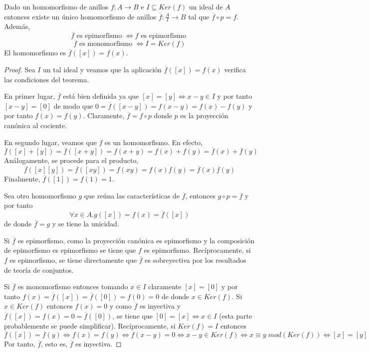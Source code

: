 \begin{proposition}
	Dado un homomorfismo de anillos $f:A \to B$ e $I \subseteq Ker(f)$ un ideal de $A$ entonces existe un único homomorfismo de anillos $\overline{f}:\frac{A}{I} \to B$ tal que $\overline{f} \circ p = f$. Además, $$\overline{f} \text{ es epimorfismo } \iff f \text{ es epimorfismo }$$ $$\overline{f} \text{ es monomorfismo } \iff I = Ker(f)$$ El homomorfismo es $\overline{f}([x]) = f(x)$. 
	
\end{proposition}
\begin{proof}
	Sea $I$ un tal ideal y veamos que la aplicación $\overline{f}([x]) = f(x)$ verifica las condiciones del teorema. 
	
	En primer lugar, $\overline{f}$ está bien definida ya que $[x] = [y] \iff x-y \in I$ y por tanto $[x-y] = [0]$ de modo que $0 = \overline{f}([x-y]) = f(x-y) = f(x) - f(y) $ y por tanto $f(x) = f(y)$. Claramente, $\overline{f} = f \circ p$ donde $p$ es la proyección canónica al cociente.  
	
	En segundo lugar, veamos que $\overline{f}$ es un homomorfismo. En efecto, $$\overline{f}([x]+[y]) =\overline{f}([x+y]) = f(x+y) = f(x) + f(y) = \overline{f}(x) + \overline{f}(y)$$ Análogamente, se procede para el producto, $$\overline{f}([x][y]) =\overline{f}([xy]) = f(xy) = f(x)f(y) = \overline{f}(x)\overline{f}(y)$$ Finalmente, $\overline{f}([1]) = f(1) = 1$. 
	
	Sea otro homomorfismo $g$ que reúna las características de $\overline{f}$, entonces $g \circ p = f$ y por tanto $$\forall x \in A. g([x]) = f(x) = \overline{f}([x])$$ de donde $\overline{f} = g$ y se tiene la unicidad. 
	
	Si $\overline{f}$ es epimorfismo, como la proyección canónica es epimorfismo y la composición de epimorfismo es epimorfismo se tiene que $f$ es epimorfismo. Recíprocamente, si $f$ es epimorfismo, se tiene directamente que $\overline{f}$ es sobreyectiva por los resultados de  teoría de conjuntos. 
	
	Si $\overline{f}$ es monomorfismo entonces tomando $x \in I$ claramente $[x] = [0]$ y por tanto $f(x) = \overline{f}([x]) = \overline{f}([0]) = f(0) = 0$ de donde $x \in Ker(f)$. Si $x \in Ker(f)$ entonces $f(x) = 0$ y como $\overline{f}$ es inyectiva y $\overline{f}([x]) = f(x) = 0 = \overline{f}([0])$, se tiene que $[0] = [x] \iff x \in I$ (esta parte probablemente se puede simplificar). Recíprocamente, si $Ker(f) = I$ entonces $$\overline{f}([x]) = \overline{f}(y) \iff f(x) = f(y) \iff f(x-y) = 0 \iff x-y \in Ker(f) \iff x \equiv y \; mod(Ker(f)) \iff [x] = [y]$$ Por tanto, $\overline{f}$, esto es, $\overline{f}$ es inyectiva.
\end{proof}

